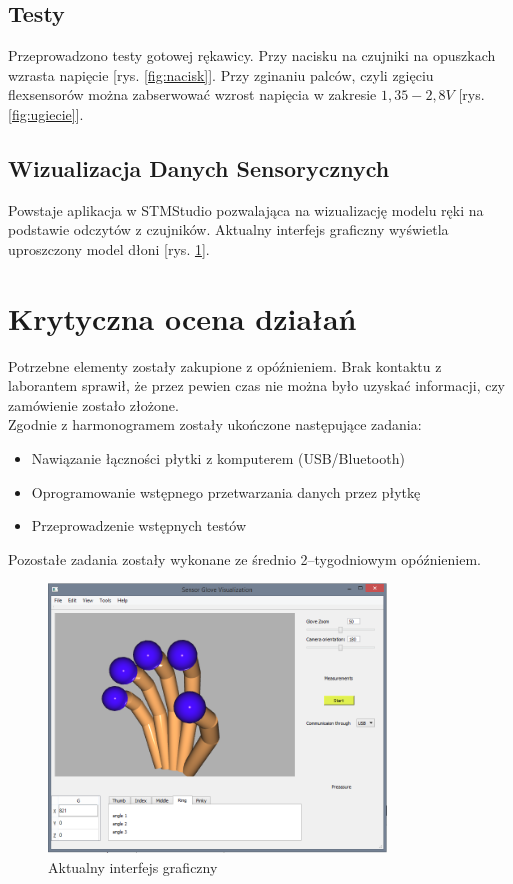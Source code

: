 \documentclass[12pt,a4paper]{article}
\begin{document}
\subsection{Testy}
Przeprowadzono testy gotowej rękawicy. Przy nacisku na czujniki na opuszkach wzrasta napięcie [rys. \ref{fig:nacisk}]. Przy zginaniu palców, czyli zgięciu flexsensorów można zabserwować wzrost napięcia w zakresie $1,35-2,8V$ [rys. \ref{fig:ugiecie}].


\subsection{Wizualizacja Danych Sensorycznych}
Powstaje aplikacja w STMStudio pozwalająca na wizualizację modelu ręki na podstawie odczytów z czujników. Aktualny interfejs graficzny wyświetla uproszczony model dłoni [rys. \ref{fig:wds}].


\section{Krytyczna ocena działań}
Potrzebne elementy zostały zakupione z opóźnieniem. Brak kontaktu z laborantem sprawił, że przez pewien czas nie można było uzyskać informacji, czy zamówienie zostało złożone. 
\\Zgodnie z harmonogramem zostały ukończone następujące zadania:
\begin{itemize}
\item Nawiązanie łączności płytki z komputerem (USB/Bluetooth)
\item Oprogramowanie wstępnego przetwarzania danych przez płytkę
\item Przeprowadzenie wstępnych testów
\end{itemize}
Pozostałe zadania zostały wykonane ze średnio 2--tygodniowym opóźnieniem. 
\\
\begin{figure}[h]
\centering
\includegraphics[width=0.8\textwidth]{images/aktualnyinterfejsgraficzny.png}
\caption{Aktualny interfejs graficzny}
\label{fig:wds}
\end{figure}
\end{document}
